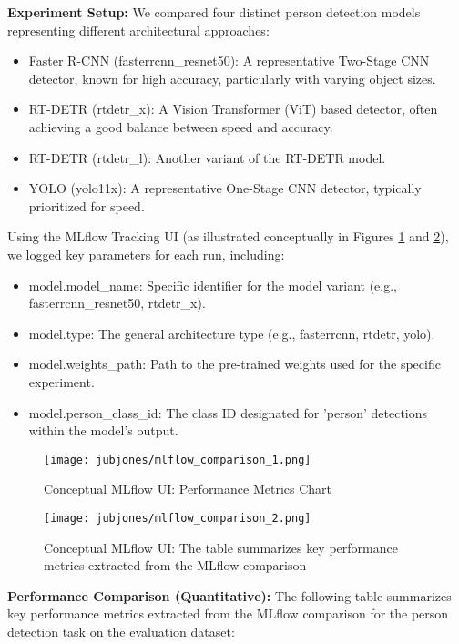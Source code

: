 \textbf{Experiment Setup:}
We compared four distinct person detection models representing different architectural approaches:
\begin{itemize}
    \item Faster R-CNN (fasterrcnn\_resnet50): A representative Two-Stage CNN detector, known for high accuracy, particularly with varying object sizes.
    \item RT-DETR (rtdetr\_x): A Vision Transformer (ViT) based detector, often achieving a good balance between speed and accuracy.
    \item RT-DETR (rtdetr\_l): Another variant of the RT-DETR model.
    \item YOLO (yolo11x): A representative One-Stage CNN detector, typically prioritized for speed.
\end{itemize}
Using the MLflow Tracking UI (as illustrated conceptually in Figures \ref{fig:mlflow_comparison_1} and \ref{fig:mlflow_comparison_2}), we logged key parameters for each run, including:
\begin{itemize}
    \item model.model\_name: Specific identifier for the model variant (e.g., fasterrcnn\_resnet50, rtdetr\_x).
    \item model.type: The general architecture type (e.g., fasterrcnn, rtdetr, yolo).
    \item model.weights\_path: Path to the pre-trained weights used for the specific experiment.
    \item model.person\_class\_id: The class ID designated for 'person' detections within the model's output.
\end{itemize}

\begin{figure}[!htb]
    \centering
    \texttt{[image: jubjones/mlflow\_comparison\_1.png]} %
    \caption{Conceptual MLflow UI: Performance Metrics Chart}
    \label{fig:mlflow_comparison_1}
\end{figure}

\begin{figure}[!htb]
    \centering
    \texttt{[image: jubjones/mlflow\_comparison\_2.png]} %
    \caption{Conceptual MLflow UI: The table summarizes key performance metrics extracted from the MLflow comparison}
    \label{fig:mlflow_comparison_2}
\end{figure}
\clearpage

\textbf{Performance Comparison (Quantitative):}
The following table summarizes key performance metrics extracted from the MLflow comparison for the person detection task on the evaluation dataset:

